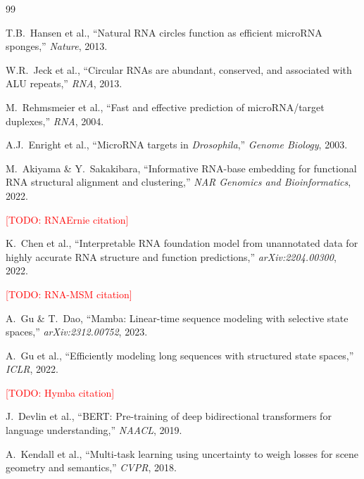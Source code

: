 \documentclass[10pt,twocolumn]{article}
\newcommand{\todo}[1]{\textcolor{red}{[TODO: #1]}}
\begin{document}

\begin{thebibliography}{99}

T.B.\ Hansen et al., ``Natural RNA circles function as efficient
microRNA sponges,'' \textit{Nature}, 2013.

W.R.\ Jeck et al., ``Circular RNAs are abundant, conserved, and
associated with ALU repeats,'' \textit{RNA}, 2013.

M.\ Rehmsmeier et al., ``Fast and effective prediction of microRNA/target
duplexes,'' \textit{RNA}, 2004.

A.J.\ Enright et al., ``MicroRNA targets in \textit{Drosophila},''
\textit{Genome Biology}, 2003.

M.\ Akiyama \& Y.\ Sakakibara, ``Informative RNA-base embedding for
functional RNA structural alignment and clustering,'' \textit{NAR Genomics
and Bioinformatics}, 2022.

\todo{RNAErnie citation}

K.\ Chen et al., ``Interpretable RNA foundation model from unannotated
data for highly accurate RNA structure and function predictions,''
\textit{arXiv:2204.00300}, 2022.

\todo{RNA-MSM citation}

A.\ Gu \& T.\ Dao, ``Mamba: Linear-time sequence modeling with selective
state spaces,'' \textit{arXiv:2312.00752}, 2023.

A.\ Gu et al., ``Efficiently modeling long sequences with structured
state spaces,'' \textit{ICLR}, 2022.

\todo{Hymba citation}

J.\ Devlin et al., ``BERT: Pre-training of deep bidirectional transformers
for language understanding,'' \textit{NAACL}, 2019.

A.\ Kendall et al., ``Multi-task learning using uncertainty to weigh
losses for scene geometry and semantics,'' \textit{CVPR}, 2018.

\end{thebibliography}
\end{document}
